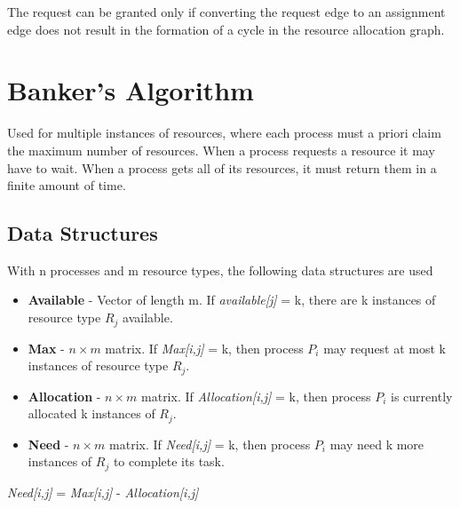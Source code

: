 \documentclass[oneside]{book}
\begin{document}
            The request can be granted only if converting the request edge to an assignment edge does not result 
            in the formation of a cycle in the resource allocation graph.
        \section{Banker's Algorithm}
            Used for multiple instances of resources, where each process must a priori claim the maximum number of resources.
            When a process requests a resource it may have to wait. When a process gets all of its resources, it must return them
            in a finite amount of time.
            \subsection{Data Structures}
                With n processes and m resource types, the following data structures are used
                \begin{itemize}
                    \item \textbf{Available} - Vector of length m. If \textit{available[j]} = k,
                    there are k instances of resource type $R_j$ available.
                    \item \textbf{Max} - $n\times m$ matrix. If \textit{Max[i,j]} = k, then process $P_i$ may
                    request at most k instances of resource type $R_j$.
                    \item \textbf{Allocation} - $n\times m$ matrix. If \textit{Allocation[i,j]} = k, then
                    process $P_i$ is currently allocated k instances of $R_j$.
                    \item \textbf{Need} - $n\times m$ matrix. If \textit{Need[i,j]} = k, then process $P_i$
                    may need k more instances of $R_j$ to complete its task.
                \end{itemize}
                \begin{center}
                    \textit{Need[i,j]} = \textit{Max[i,j]} - \textit{Allocation[i,j]}
                \end{center}
\end{document}
